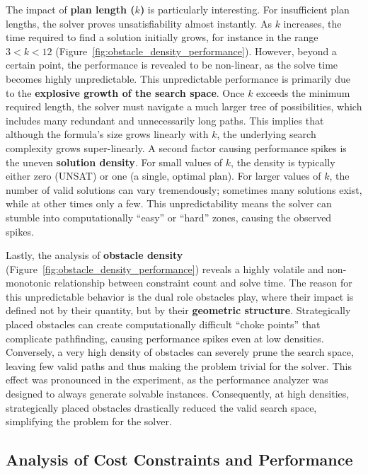 \documentclass[12pt, a4paper, oneside]{report} %
\begin{document}
The impact of \textbf{plan length ($k$)} is particularly interesting. For insufficient plan lengths, the solver proves unsatisfiability almost instantly. As $k$ increases, the time required to find a solution initially grows, for instance in the range $3 < k < 12$ (Figure~\ref{fig:obstacle_density_performance}). However, beyond a certain point, the performance is revealed to be non-linear, as the solve time becomes highly unpredictable. This unpredictable performance is primarily due to the \textbf{explosive growth of the search space}. Once $k$ exceeds the minimum required length, the solver must navigate a much larger tree of possibilities, which includes many redundant and unnecessarily long paths. This implies that although the formula’s size grows linearly with $k$, the underlying search complexity grows super-linearly. A second factor causing performance spikes is the uneven \textbf{solution density}. For small values of $k$, the density is typically either zero (UNSAT) or one (a single, optimal plan). For larger values of $k$, the number of valid solutions can vary tremendously; sometimes many solutions exist, while at other times only a few. This unpredictability means the solver can stumble into computationally ``easy'' or ``hard'' zones, causing the observed spikes.

Lastly, the analysis of \textbf{obstacle density} (Figure~\ref{fig:obstacle_density_performance}) reveals a highly volatile and non-monotonic relationship between constraint count and solve time. The reason for this unpredictable behavior is the dual role obstacles play, where their impact is defined not by their quantity, but by their \textbf{geometric structure}. Strategically placed obstacles can create computationally difficult ``choke points'' that complicate pathfinding, causing performance spikes even at low densities. Conversely, a very high density of obstacles can severely prune the search space, leaving few valid paths and thus making the problem trivial for the solver. This effect was pronounced in the experiment, as the performance analyzer was designed to always generate solvable instances. Consequently, at high densities, strategically placed obstacles drastically reduced the valid search space, simplifying the problem for the solver.


\subsection*{Analysis of Cost Constraints and Performance}
\end{document}
